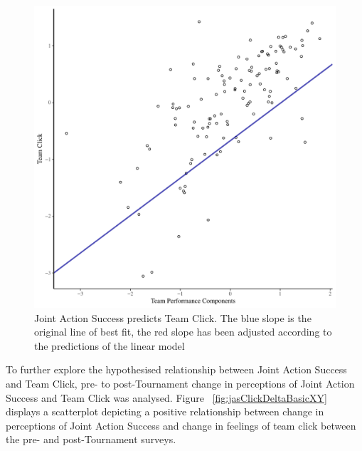 \begin{figure}[htbp]
  \centering
\includegraphics[scale = .5]{images/jasClickModelSlope}
  \caption{Joint Action Success predicts Team Click. The blue slope is the original line of best fit, the red slope has been adjusted according to the predictions of the linear model}
  \label{fig:jasClickModelSLope}
\end{figure}



To further explore the hypothesised relationship between Joint Action Success and Team Click, pre- to post-Tournament change in perceptions of Joint Action Success and Team Click was analysed.  Figure ~\ref{fig:jasClickDeltaBasicXY} displays a scatterplot depicting a positive relationship between change in perceptions of Joint Action Success and change in feelings of team click between the pre- and post-Tournament surveys.

